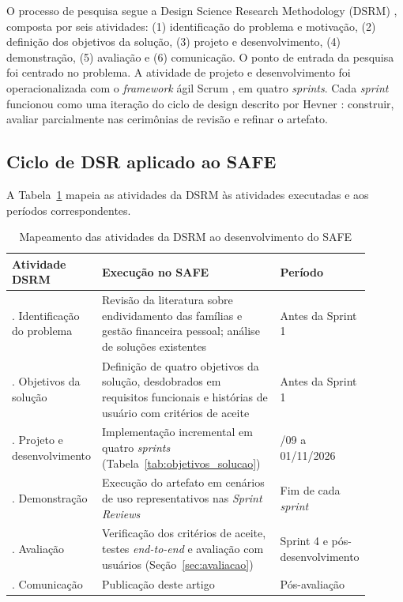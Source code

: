 \documentclass[portuguese]{sbc2025}%
\begin{document}
O processo de pesquisa segue a Design Science Research Methodology (DSRM) \citep{peffers2007}, composta por seis atividades: (1) identificação do problema e motivação, (2) definição dos objetivos da solução, (3) projeto e desenvolvimento, (4) demonstração, (5) avaliação e (6) comunicação. O ponto de entrada da pesquisa foi centrado no problema. A atividade de projeto e desenvolvimento foi operacionalizada com o \textit{framework} ágil Scrum \citep{schwaber2020}, em quatro \textit{sprints}. Cada \textit{sprint} funcionou como uma iteração do ciclo de design descrito por Hevner \citeyearpar{hevner2007}: construir, avaliar parcialmente nas cerimônias de revisão e refinar o artefato.

\subsection{Ciclo de DSR aplicado ao SAFE}

A Tabela~\ref{tab:mapeamento_dsrm} mapeia as atividades da DSRM às atividades executadas e aos períodos correspondentes.


\begin{table}[!ht]
\caption{Mapeamento das atividades da DSRM ao desenvolvimento do SAFE}
\centering
\footnotesize %
\begin{tabular}{@{} >{\raggedright\arraybackslash}p{0.22\linewidth} >{\raggedright\arraybackslash}p{0.50\linewidth} >{\raggedright\arraybackslash}p{0.18\linewidth} @{}}
\hline\hline
\textbf{Atividade DSRM} & \textbf{Execução no SAFE} & \textbf{Período} \\
\hline
1. Identificação do problema & Revisão da literatura sobre endividamento das famílias e gestão financeira pessoal; análise de soluções existentes & Antes da Sprint 1 \\
2. Objetivos da solução & Definição de quatro objetivos da solução, desdobrados em requisitos funcionais e histórias de usuário com critérios de aceite & Antes da Sprint 1 \\
3. Projeto e desenvolvimento & Implementação incremental em quatro \textit{sprints} (Tabela~\ref{tab:objetivos_solucao}) & 16/09 a 01/11/2026 \\
4. Demonstração & Execução do artefato em cenários de uso representativos nas \textit{Sprint Reviews} & Fim de cada \textit{sprint} \\
5. Avaliação & Verificação dos critérios de aceite, testes \textit{end-to-end} e avaliação com usuários (Seção~\ref{sec:avaliacao}) & Sprint 4 e pós-desenvolvimento \\
6. Comunicação & Publicação deste artigo & Pós-avaliação \\
\hline\hline
\end{tabular}
\label{tab:mapeamento_dsrm}
\end{table}
\end{document}

